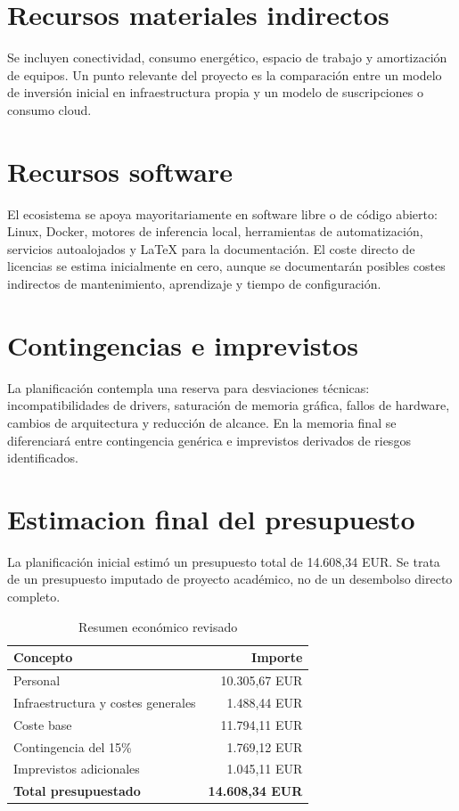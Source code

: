 \section{Recursos materiales indirectos}
Se incluyen conectividad, consumo energético, espacio de trabajo y amortización de equipos. Un punto relevante del proyecto es la comparación entre un modelo de inversión inicial en infraestructura propia y un modelo de suscripciones o consumo cloud.

\section{Recursos software}
El ecosistema se apoya mayoritariamente en software libre o de código abierto: Linux, Docker, motores de inferencia local, herramientas de automatización, servicios autoalojados y LaTeX para la documentación. El coste directo de licencias se estima inicialmente en cero, aunque se documentarán posibles costes indirectos de mantenimiento, aprendizaje y tiempo de configuración.

\section{Contingencias e imprevistos}
La planificación contempla una reserva para desviaciones técnicas: incompatibilidades de drivers, saturación de memoria gráfica, fallos de hardware, cambios de arquitectura y reducción de alcance. En la memoria final se diferenciará entre contingencia genérica e imprevistos derivados de riesgos identificados.

\section{Estimacion final del presupuesto}
La planificación inicial estimó un presupuesto total de 14.608,34 EUR. Se trata de un presupuesto imputado de proyecto académico, no de un desembolso directo completo.

\begin{table}[H]
  \centering
  \caption{Resumen económico revisado}
  \label{tab:resumen-economico}
  \begin{tabular}{lr}
    \toprule
    Concepto & Importe \\
    \midrule
    Personal & 10.305,67 EUR \\
    Infraestructura y costes generales & 1.488,44 EUR \\
    \midrule
    Coste base & 11.794,11 EUR \\
    Contingencia del 15\% & 1.769,12 EUR \\
    Imprevistos adicionales & 1.045,11 EUR \\
    \midrule
    \textbf{Total presupuestado} & \textbf{14.608,34 EUR} \\
    \bottomrule
  \end{tabular}
\end{table}

